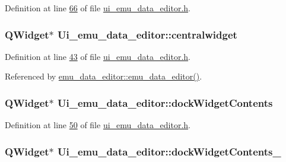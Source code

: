 Definition at line \hyperlink{a00138_source_l00066}{66} of file \hyperlink{a00138_source}{ui\+\_\+emu\+\_\+data\+\_\+editor.\+h}.

\hypertarget{a00079_afff870ab422d2b873976067827089af1}{
\subsubsection[{centralwidget}]{\setlength{\rightskip}{0pt plus 5cm}Q\+Widget$\ast$ Ui\+\_\+emu\+\_\+data\+\_\+editor\+::centralwidget}}\label{a00079_afff870ab422d2b873976067827089af1}


Definition at line \hyperlink{a00138_source_l00043}{43} of file \hyperlink{a00138_source}{ui\+\_\+emu\+\_\+data\+\_\+editor.\+h}.



Referenced by \hyperlink{a00093_source_l00012}{emu\+\_\+data\+\_\+editor\+::emu\+\_\+data\+\_\+editor()}.

\hypertarget{a00079_a78f9e81c1adc0092b7e4d6efb640dc43}{
\subsubsection[{dock\+Widget\+Contents}]{\setlength{\rightskip}{0pt plus 5cm}Q\+Widget$\ast$ Ui\+\_\+emu\+\_\+data\+\_\+editor\+::dock\+Widget\+Contents}}\label{a00079_a78f9e81c1adc0092b7e4d6efb640dc43}


Definition at line \hyperlink{a00138_source_l00050}{50} of file \hyperlink{a00138_source}{ui\+\_\+emu\+\_\+data\+\_\+editor.\+h}.

\hypertarget{a00079_ae304b249d83cb3152fbbf7a7d7e0e29b}{
\subsubsection[{dock\+Widget\+Contents\+\_\+2}]{\setlength{\rightskip}{0pt plus 5cm}Q\+Widget$\ast$ Ui\+\_\+emu\+\_\+data\+\_\+editor\+::dock\+Widget\+Contents\+\_}}\label{a00079_ae304b249d83cb3152fbbf7a7d7e0e29b}


